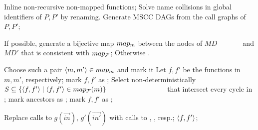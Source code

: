 \noindent
\begin{algorithm}
\begin{minipage}{\linewidth}
\begin{algorithmic}[1]
\State \label{step:inline} Inline non-recursive non-mapped functions;
\State \label{step:rename} Solve name collisions in global identifiers of $P,P'$ by
renaming.
\State \label{step:generate} Generate MSCC DAGs  from the
call graphs of $P,P'$;

\State If possible, generate a bijective map
\label{step:generate_map} $map_m$ between the nodes of $MD$ \newline \mbox{~~~~~~} and $MD'$ that is consistent with $map_{\cal F}$;
Otherwise \abort.

 \label{step:while}
   \State \label{step:choose} Choose such a pair $\langle m,m'\rangle \in map_m$ and mark it \mscccovered
    \label{step:m1}
     \State Let $f,f'$ be the functions in $m,m'$, respectively;
      \label{step:Check}
     mark $f,f'$ as \mtlabel; \label{step:markTrivial}
     \EndIf
   \Else
    \label{step:select} Select non-deterministically
         $S \subseteq \{\langle f,f'\rangle\mid \langle f,f'\rangle\in map_{\cal F}(m)\}$ \newline
          \mbox{~~~~~~~~~~~~~~~~} that intersect every cycle in ;
      \label{step:forall}
         \label{step:abort}{mark ancestors as \mscccovered;}
        \EndIf
      \EndFor
       \label{step:forall2}
         mark $f,f'$ as \mtlabel; \label{step:markNonTrivial}
      \EndFor
   \EndIf
\EndWhile
\EndFunction%

\vspace{0.25 cm}


 
  \label{step:forcheckCallequiv}
     \label{step:substitute}
      \State \label{step:subst_uf}Replace calls to $g(\vec{in})$, $g'(\vec{in'})$ with calls to , , resp.;
     \label{step:isinline}
    \EndIf
  \EndFor
  \State \Return $\langle f,f'\rangle$;
\EndFunction
\vspace{0.25 cm}


\end{algorithmic}
\end{minipage}
\end{algorithm}
